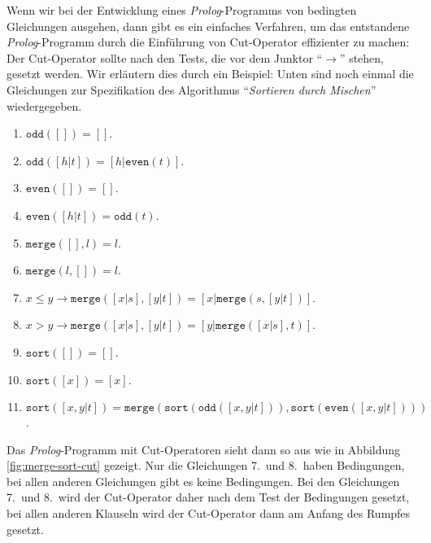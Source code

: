 Wenn wir bei der Entwicklung eines \textsl{Prolog}-Programms von bedingten Gleichungen
ausgehen, dann gibt es ein einfaches Verfahren, um das entstandene
\textsl{Prolog}-Programm durch die Einf\"{u}hrung von Cut-Operator effizienter zu machen:
Der Cut-Operator sollte nach den Tests, die vor dem Junktor ``$\rightarrow$'' stehen,
gesetzt werden.  Wir erl\"{a}utern dies durch ein Beispiel:  Unten sind noch einmal die
Gleichungen zur Spezifikation des Algorithmus ``\emph{Sortieren durch Mischen}'' wiedergegeben.
\begin{enumerate}
\item $\mathtt{odd}([]) = []$.
\item $\mathtt{odd}([h|t]) = [h|\mathtt{even}(t)]$.
\item $\mathtt{even}([]) = []$.
\item $\mathtt{even}([h|t]) = \mathtt{odd}(t)$.
\item $\mathtt{merge}([], l) = l$.
\item $\mathtt{merge}(l, []) = l$.
\item $x \leq y \rightarrow \mathtt{merge}([x|s], [y|t]) = [x|\mathtt{merge}(s, [y|t])]$.
\item $x  >   y \rightarrow \mathtt{merge}([x|s], [y|t]) = [y|\mathtt{merge}([x|s], t)]$.
\item $\mathtt{sort}([]) = []$.
\item $\mathtt{sort}([x]) = [x]$.
\item $\mathtt{sort}([x,y|t]) = \mathtt{merge}( \mathtt{sort}(\mathtt{odd}([x,y|t])), \mathtt{sort}(\mathtt{even}([x,y|t])))$.
\end{enumerate}
Das \textsl{Prolog}-Programm mit Cut-Operatoren sieht dann so aus wie in Abbildung
\ref{fig:merge-sort-cut} gezeigt.  Nur die Gleichungen 7.~und 8.~haben Bedingungen, bei
allen anderen Gleichungen gibt es keine Bedingungen.  Bei den Gleichungen 7.~und 8.~wird
der Cut-Operator daher nach dem Test der Bedingungen gesetzt, bei allen anderen Klauseln
wird der Cut-Operator dann am Anfang des Rumpfes gesetzt.

